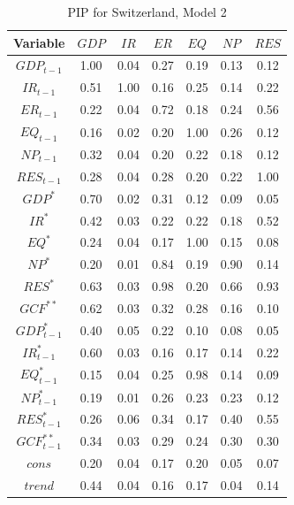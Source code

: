 \documentclass[a4paper, twoside]{templates/ociamthesis}
\begin{document}
\begin{table}[!ht]

\caption{\label{tab:TablePIPCH2}PIP for Switzerland, Model 2}
\centering
\fontsize{8}{10}\selectfont
\begin{tabular}[t]{ccccccc}
\toprule
Variable & $GDP$ & $IR$ & $ER$ & $EQ$ & $NP$ & $RES$\\
\midrule
$GDP_{t-1}$ & 1.00 & 0.04 & 0.27 & 0.19 & 0.13 & 0.12\\
$IR_{t-1}$ & 0.51 & 1.00 & 0.16 & 0.25 & 0.14 & 0.22\\
$ER_{t-1}$ & 0.22 & 0.04 & 0.72 & 0.18 & 0.24 & 0.56\\
$EQ_{t-1}$ & 0.16 & 0.02 & 0.20 & 1.00 & 0.26 & 0.12\\
$NP_{t-1}$ & 0.32 & 0.04 & 0.20 & 0.22 & 0.18 & 0.12\\
$RES_{t-1}$ & 0.28 & 0.04 & 0.28 & 0.20 & 0.22 & 1.00\\
$GDP^*$ & 0.70 & 0.02 & 0.31 & 0.12 & 0.09 & 0.05\\
$IR^*$ & 0.42 & 0.03 & 0.22 & 0.22 & 0.18 & 0.52\\
$EQ^*$ & 0.24 & 0.04 & 0.17 & 1.00 & 0.15 & 0.08\\
$NP^*$ & 0.20 & 0.01 & 0.84 & 0.19 & 0.90 & 0.14\\
$RES^*$ & 0.63 & 0.03 & 0.98 & 0.20 & 0.66 & 0.93\\
$GCF^{**}$ & 0.62 & 0.03 & 0.32 & 0.28 & 0.16 & 0.10\\
$GDP^*_{t-1}$ & 0.40 & 0.05 & 0.22 & 0.10 & 0.08 & 0.05\\
$IR^*_{t-1}$ & 0.60 & 0.03 & 0.16 & 0.17 & 0.14 & 0.22\\
$EQ^*_{t-1}$ & 0.15 & 0.04 & 0.25 & 0.98 & 0.14 & 0.09\\
$NP^*_{t-1}$ & 0.19 & 0.01 & 0.26 & 0.23 & 0.23 & 0.12\\
$RES^*_{t-1}$ & 0.26 & 0.06 & 0.34 & 0.17 & 0.40 & 0.55\\
$GCF^{**}_{t-1}$ & 0.34 & 0.03 & 0.29 & 0.24 & 0.30 & 0.30\\
$cons$ & 0.20 & 0.04 & 0.17 & 0.20 & 0.05 & 0.07\\
$trend$ & 0.44 & 0.04 & 0.16 & 0.17 & 0.04 & 0.14\\
\bottomrule
\end{tabular}
\end{table}

\clearpage
\end{document}
